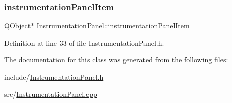 \subsubsection{\texorpdfstring{instrumentation\+Panel\+Item}{instrumentationPanelItem}}
{\footnotesize\ttfamily Q\+Object$\ast$ Instrumentation\+Panel\+::instrumentation\+Panel\+Item}



Definition at line 33 of file Instrumentation\+Panel.\+h.



The documentation for this class was generated from the following files\+:\begin{DoxyCompactItemize}
\item 
include/\hyperlink{_instrumentation_panel_8h}{Instrumentation\+Panel.\+h}\item 
src/\hyperlink{_instrumentation_panel_8cpp}{Instrumentation\+Panel.\+cpp}\end{DoxyCompactItemize}
